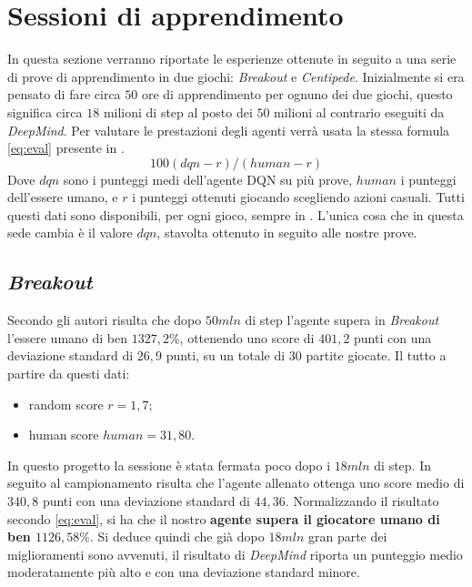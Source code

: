 \documentclass[twoside,twocolumn,10pt]{extarticle}
\theoremstyle{definition}
\begin{document}
\section{Sessioni di apprendimento}
	In questa sezione verranno riportate le esperienze ottenute in seguito a una serie di prove di apprendimento in due giochi: \textit{Breakout} e \textit{Centipede}. Inizialmente si era pensato di fare circa $50$ ore di apprendimento per ognuno dei due giochi, questo significa circa $18$ milioni di step al posto dei $50$ milioni al contrario eseguiti da \textit{DeepMind}. Per valutare le prestazioni degli agenti verrà usata la stessa formula \ref{eq:eval} presente in \cite{bib:dqn}.
	\begin{equation}\label{eq:eval}
		100(dqn - r)/(human - r)
	\end{equation}
	Dove $dqn$ sono i punteggi medi dell'agente DQN su più prove, $human$ i punteggi dell'essere umano, e $r$ i punteggi ottenuti giocando scegliendo azioni casuali. Tutti questi dati sono disponibili, per ogni gioco, sempre in \cite{bib:dqn}. L'unica cosa che in questa sede cambia è il valore $dqn$, stavolta ottenuto in seguito alle nostre prove.
	
	\subsection{\textit{Breakout}}
		Secondo gli autori risulta che dopo $50mln$ di step l'agente supera in \textit{Breakout} l'essere umano di ben $1327,2\%$, ottenendo uno score di $401,2$ punti con una deviazione standard di $26,9$ punti, su un totale di $30$ partite giocate. Il tutto a partire da questi dati:
		\begin{itemize}
			\item random score $r = 1,7$;
			\item human score $human = 31,80$.
		\end{itemize}
		
		In questo progetto la sessione è stata fermata poco dopo i $18mln$ di step. In seguito al campionamento risulta che l'agente allenato ottenga uno score medio di $340,8$ punti con una deviazione standard di $44,36$. Normalizzando il risultato secondo \ref{eq:eval}, si ha che il nostro \textbf{agente supera il giocatore umano di ben $1126,58\%$}. Si deduce quindi che già dopo $18mln$ gran parte dei miglioramenti sono avvenuti, il risultato di \textit{DeepMind} riporta un punteggio medio moderatamente più alto e con una deviazione standard minore.
\end{document}
